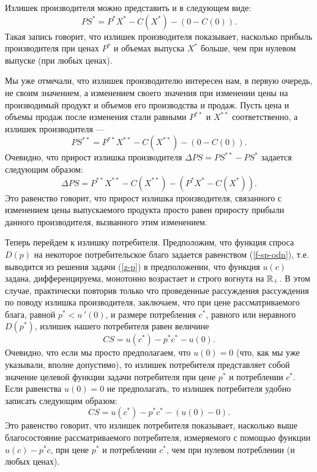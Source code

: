     Излишек производителя можно представить и в следующем виде:
    \[PS^{*}=P^{*}X^{*}-C(X^{*})-(0-C(0)).\]
    Такая запись говорит, что излишек производителя показывает,
    насколько прибыль производителя при ценах $P^{*}$ и объемах
    выпуска $X^{*}$ больше, чем при нулевом выпуске (при любых ценах).

    Мы уже отмечали, что излишек производителю интересен нам, в первую очередь,
    не своим значением, а изменением своего значения при изменении
    цены на производимый продукт и объемов его производства и продаж.
    Пусть цена и объемы продаж после изменения стали равными $P^{**}$
    и $X^{**}$ соответственно, а излишек
    производителя ---
    \[PS^{**}=P^{**}X^{**}-C(X^{**})-(0-C(0)).\]
    Очевидно, что прирост излишка производителя
    $\Delta PS=PS^{**}-PS^{*}$ задается следующим образом:
    \[\Delta PS=P^{**}X^{**}-C(X^{**})-(P^{*}X^{*}-C(X^{*})).\]
    Это равенство говорит, что прирост излишка производителя,
    связанного с изменением цены выпускаемого продукта просто равен
    приросту прибыли данного производителя, вызванного этим
    изменением.


    Теперь перейдем к излишку потребителя. Предположим, что функция
    спроса $D(p)$ на некоторое потребительское благо задается
    равенством (\ref{f-sp-odn}), т.е.
    выводится из решения задачи (\ref{z-p}) в предположении, что функция
    $u(c)$ задана, дифференцируема, монотонно возрастает и строго вогнута на
    $\mathbb{R}_{+}$. В этом случае, практически повторив только что
    проведенные рассуждения рассуждения по поводу излишка
    производителя, заключаем, что при цене рассматриваемого блага,
    равной $p^{*}<u\,'(0)$, и
    размере потребления $c^{*}$, равного или неравного $D(p^{*})$,
    излишек нашего потребителя равен величине
\begin{equation*}
\label{iz-pot}
    CS=u(c^{*})-p^{*}c^{*}-u(0).
\end{equation*}
    Очевидно, что если мы просто предполагаем, что $u(0)=0$ (что, как мы
    уже указывали, вполне допустимо), то излишек потребителя
    представляет собой значение целевой функции задачи потребителя
    при цене $p^{*}$ и потреблении $c^{*}$. Если равенства $u(0)=0$ не
    предполагать, то излишек потребителя удобно записать следующим
    образом:
    \[CS=u(c^{*})-p^{*}c^{*}-(u(0)-0).\]
    Это равенство говорит, что излишек потребителя показывает,
    насколько выше благосостояние рассматриваемого потребителя,
    измеряемого с помощью функции $u(c)-p^{*}c$,
    при цене $p^{*}$ и потреблении $c^{*}$, чем при нулевом потреблении
    (и любых ценах).

